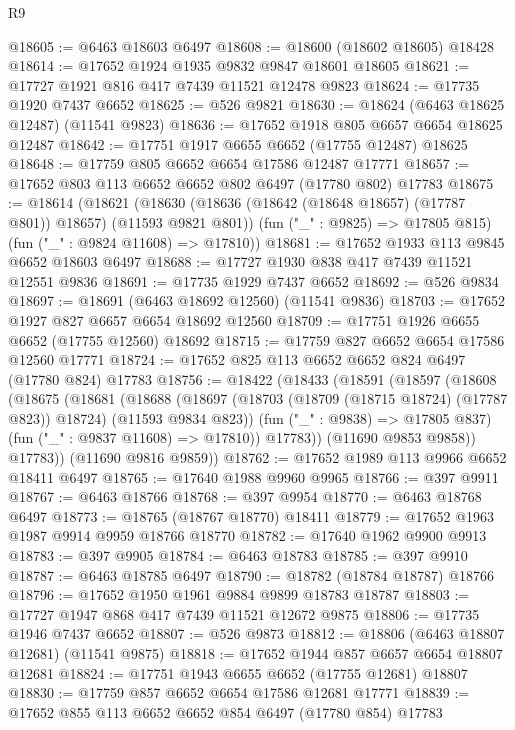 \begin{lexlean}{R9}
\begin{coremodule}
{{{{{{{{{{{{{{{{{{{{{{{{{{{{{{{{{{{{{{{{{{{{{{{{{{{{{{{{{{{{{{{{{{{{{{{{{{{{{{{{{{{{@18605 := @6463 @18603 @6497
@18608 := @18600 (@18602 @18605) @18428
@18614 := @17652 @1924 @1935 @9832 @9847 @18601 @18605
@18621 := @17727 @1921 @816 @417 @7439 @11521 @12478 @9823
@18624 := @17735 @1920 @7437 @6652
@18625 := @526 @9821
@18630 := @18624 (@6463 @18625 @12487) (@11541 @9823)
@18636 := @17652 @1918 @805 @6657 @6654 @18625 @12487
@18642 := @17751 @1917 @6655 @6652 (@17755 @12487) @18625
@18648 := @17759 @805 @6652 @6654 @17586 @12487 @17771
@18657 := @17652 @803 @113 @6652 @6652 @802 @6497 (@17780 @802) @17783
@18675 := @18614
    (@18621
      (@18630 (@18636 (@18642 (@18648 @18657) (@17787 @801)) @18657) (@11593 @9821 @801))
      (fun ("_" : @9825) => @17805 @815)
      (fun ("_" : @9824 @11608) => @17810))
@18681 := @17652 @1933 @113 @9845 @6652 @18603 @6497
@18688 := @17727 @1930 @838 @417 @7439 @11521 @12551 @9836
@18691 := @17735 @1929 @7437 @6652
@18692 := @526 @9834
@18697 := @18691 (@6463 @18692 @12560) (@11541 @9836)
@18703 := @17652 @1927 @827 @6657 @6654 @18692 @12560
@18709 := @17751 @1926 @6655 @6652 (@17755 @12560) @18692
@18715 := @17759 @827 @6652 @6654 @17586 @12560 @17771
@18724 := @17652 @825 @113 @6652 @6652 @824 @6497 (@17780 @824) @17783
@18756 := @18422
    (@18433
      (@18591
        (@18597
          (@18608
            (@18675
              (@18681
                (@18688
                  (@18697
                    (@18703 (@18709 (@18715 @18724) (@17787 @823)) @18724)
                    (@11593 @9834 @823))
                  (fun ("_" : @9838) => @17805 @837)
                  (fun ("_" : @9837 @11608) => @17810))
                @17783))
            (@11690 @9853 @9858))
          @17783))
      (@11690 @9816 @9859))
@18762 := @17652 @1989 @113 @9966 @6652 @18411 @6497
@18765 := @17640 @1988 @9960 @9965
@18766 := @397 @9911
@18767 := @6463 @18766
@18768 := @397 @9954
@18770 := @6463 @18768 @6497
@18773 := @18765 (@18767 @18770) @18411
@18779 := @17652 @1963 @1987 @9914 @9959 @18766 @18770
@18782 := @17640 @1962 @9900 @9913
@18783 := @397 @9905
@18784 := @6463 @18783
@18785 := @397 @9910
@18787 := @6463 @18785 @6497
@18790 := @18782 (@18784 @18787) @18766
@18796 := @17652 @1950 @1961 @9884 @9899 @18783 @18787
@18803 := @17727 @1947 @868 @417 @7439 @11521 @12672 @9875
@18806 := @17735 @1946 @7437 @6652
@18807 := @526 @9873
@18812 := @18806 (@6463 @18807 @12681) (@11541 @9875)
@18818 := @17652 @1944 @857 @6657 @6654 @18807 @12681
@18824 := @17751 @1943 @6655 @6652 (@17755 @12681) @18807
@18830 := @17759 @857 @6652 @6654 @17586 @12681 @17771
@18839 := @17652 @855 @113 @6652 @6652 @854 @6497 (@17780 @854) @17783
}}}}}}}}}}}}}}}}}}}}}}}}}}}}}}}}}}}}}}}}}}}}}}}}}}}}}}}}}}}}}}}}}}}}}}}}}}}}}}}}}}}}
\end{coremodule}
\end{lexlean}
